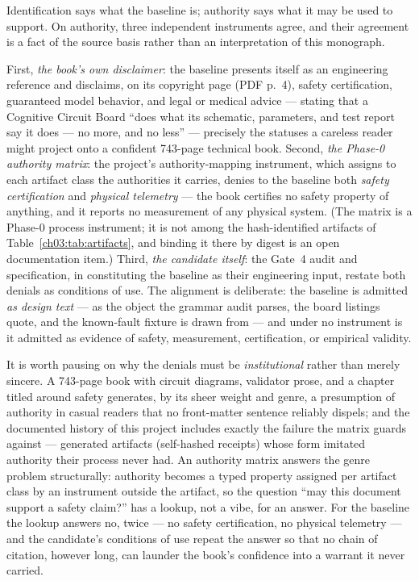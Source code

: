 Identification says what the baseline is; authority says what it may be
used to support. On authority, three independent instruments agree, and
their agreement is a fact of the source basis rather than an
interpretation of this monograph.

First, \emph{the book's own disclaimer}: the baseline presents itself
as an engineering reference and disclaims, on its copyright page (PDF
p.~4), safety certification, guaranteed model behavior, and legal or
medical advice --- stating that a Cognitive Circuit Board ``does what
its schematic, parameters, and test report say it does --- no more,
and no less'' --- precisely the statuses a careless reader might
project onto a confident 743-page technical book. Second, \emph{the
Phase-0 authority matrix}: the
project's authority-mapping instrument, which assigns to each artifact
class the authorities it carries, denies to the baseline both
\emph{safety certification} and \emph{physical telemetry} --- the book
certifies no safety property of anything, and it reports no measurement
of any physical system. (The matrix is a Phase-0 process instrument; it
is not among the hash-identified artifacts of
Table~\ref{ch03:tab:artifacts}, and binding it there by digest is an
open documentation item.) Third, \emph{the candidate itself}: the Gate~4
audit and specification, in constituting the baseline as their
engineering input, restate both denials as conditions of use. The
alignment is deliberate: the baseline is admitted \emph{as design
text} --- as the object the grammar audit parses, the board listings
quote, and the known-fault fixture is drawn from --- and under no
instrument is it admitted as evidence of safety, measurement,
certification, or empirical validity.

It is worth pausing on why the denials must be \emph{institutional}
rather than merely sincere. A 743-page book with circuit diagrams,
validator prose, and a chapter titled around safety generates, by its
sheer weight and genre, a presumption of authority in casual readers
that no front-matter sentence reliably dispels; and the documented
history of this project includes exactly the failure the matrix guards
against --- generated artifacts (self-hashed receipts) whose form
imitated authority their process never had. An authority matrix answers
the genre problem structurally: authority becomes a typed property
assigned per artifact class by an instrument outside the artifact, so
the question ``may this document support a safety claim?'' has a
lookup, not a vibe, for an answer. For the baseline the lookup answers
no, twice --- no safety certification, no physical telemetry --- and
the candidate's conditions of use repeat the answer so that no chain of
citation, however long, can launder the book's confidence into a
warrant it never carried.

